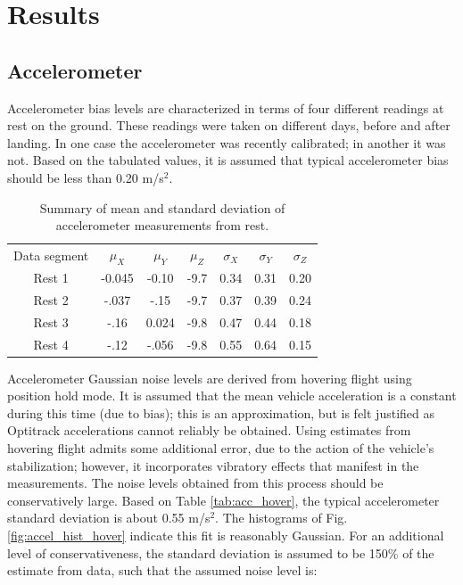 \documentclass{article}
\begin{document}
\section{Results}

\subsection{Accelerometer}

Accelerometer bias levels are characterized in terms of four different readings at rest on the ground. These readings were taken on different days, before and after landing. In one case the accelerometer was recently calibrated; in another it was not. Based on the tabulated values, it is assumed that typical accelerometer bias should be less than 0.20 m/s${}^2$.

\begin{table}[tb!]
\centering
\begin{tabular}{c|c|c|c|c|c|c}
Data segment & $\mu_X$ & $\mu_Y$ & $\mu_Z$ & $\sigma_X$ & $\sigma_Y$ & $\sigma_Z$\\
Rest 1 & -0.045 & -0.10 & -9.7 & 0.34 & 0.31 &  0.20\\
Rest 2 & -.037 & -.15 & -9.7 & 0.37 & 0.39 & 0.24\\
Rest 3 & -.16 & 0.024 & -9.8 & 0.47 & 0.44 & 0.18\\
Rest 4 & -.12 & -.056 & -9.8 & 0.55 & 0.64 & 0.15\\
\end{tabular}
\caption{Summary of mean and standard deviation of accelerometer measurements from rest.}
\label{tab:acc}
\end{table}

Accelerometer Gaussian noise levels are derived from hovering flight using position hold mode. It is assumed that the mean vehicle acceleration is a constant during this time (due to bias); this is an approximation, but is felt justified as Optitrack accelerations cannot reliably be obtained. Using estimates from hovering flight admits some additional error, due to the action of the vehicle's stabilization; however, it incorporates vibratory effects that manifest in the measurements. The noise levels obtained from this process should be conservatively large. Based on Table \ref{tab:acc_hover}, the typical accelerometer standard deviation is about 0.55 m/s${}^2$. The histograms of Fig. \ref{fig:accel_hist_hover} indicate this fit is reasonably Gaussian. For an additional level of conservativeness, the standard deviation is assumed to be 150\% of the estimate from data, such that the assumed noise level is:
\end{document}
